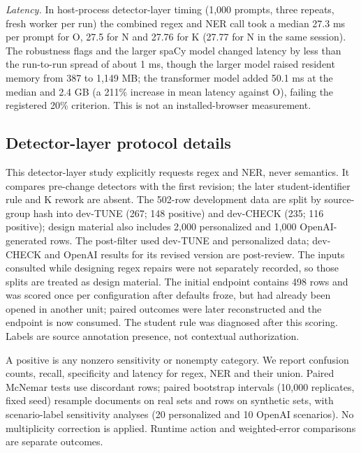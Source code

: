 \documentclass[sigconf]{acmart}
\theoremstyle{acmdefinition}\newtheorem{property}{Property}
\begin{document}
\textit{Latency.} In host-process detector-layer timing (1,000 prompts, three repeats, fresh worker per run) the combined regex and NER call took a median 27.3 ms per prompt for O, 27.5 for N and 27.76 for K (27.77 for N in the same session). The robustness flags and the larger spaCy model changed latency by less than the run-to-run spread of about 1 ms, though the larger model raised resident memory from 387 to 1,149 MB; the transformer model added 50.1 ms at the median and 2.4 GB (a 211\% increase in mean latency against O), failing the registered 20\% criterion. This is not an installed-browser measurement.

\subsection*{Detector-layer protocol details}
\label{sec:detprec_protocol}
This detector-layer study explicitly requests regex and NER, never semantics. It compares pre-change detectors with the first revision; the later student-identifier rule and K rework are absent. The 502-row development data are split by source-group hash into dev-TUNE (267; 148 positive) and dev-CHECK (235; 116 positive); design material also includes 2,000 personalized and 1,000 OpenAI-generated rows. The post-filter used dev-TUNE and personalized data; dev-CHECK and OpenAI results for its revised version are post-review. The inputs consulted while designing regex repairs were not separately recorded, so those splits are treated as design material. The initial endpoint contains 498 rows and was scored once per configuration after defaults froze, but had already been opened in another unit; paired outcomes were later reconstructed and the endpoint is now consumed. The student rule was diagnosed after this scoring. Labels are source annotation presence, not contextual authorization.

A positive is any nonzero sensitivity or nonempty category. We report confusion counts, recall, specificity and latency for regex, NER and their union. Paired McNemar tests use discordant rows; paired bootstrap intervals (10,000 replicates, fixed seed) resample documents on real sets and rows on synthetic sets, with scenario-label sensitivity analyses (20 personalized and 10 OpenAI scenarios). No multiplicity correction is applied. Runtime action and weighted-error comparisons are separate outcomes.
\end{document}
